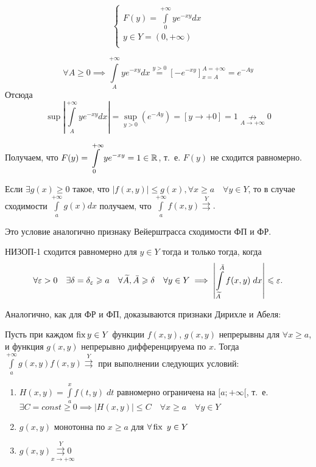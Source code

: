 \documentclass[../../main.tex]{subfiles}
\begin{document}
\begin{exmp}
\[ \left\{\begin{array}{l}
		F(y)=\int\limits_0^{+\infty}ye^{-xy}dx\\
		y \in Y = (0,+\infty)\\
		\end{array}
		\right. \]

\[\forall A \ge 0 \implies \int\limits_A^{+\infty}ye^{-xy}dx \overset{y > 0} = 
\left[-e^{-xy} \right]_{x = A}^{A = +\infty} = e^{-Ay}\]
Отсюда
\[\sup\left| \int\limits_A^{+\infty}ye^{-xy}dx \right|=\underset{y > 0}\sup  
\left( e^{-Ay}\right) = \left[y \to +0\right] = 1 \underset{A \to 
+\infty}\nrightarrow 0\]

Получаем, что $F(y) = \displaystyle\int\limits_0^{+\infty}ye^{-xy} = 1 \in 
\mathbb{R}$, т.~е. $F(y)$ не сходится 
равномерно.
\end{exmp}

\begin{thm}
Если $\exists g(x) \ge 0$ такое, что $\left| f(x,y) \right| \le g(x), \forall 
x \ge a\quad
\forall y \in Y $, то в случае сходимости $\int\limits_a^{+\infty}g(x)dx$ 
получаем, что 
$\int\limits_a^{+\infty}f(x,y) \overset{Y}\rightrightarrows.$ 
\end{thm}

Это условие аналогично признаку Вейерштрасса сходимости ФП и ФР.

\begin{crl*}
НИЗОП-1 сходится равномерно для $ y \in Y$ тогда и только тогда, 
когда\begin{equation}\label{lec10:11} \forall \varepsilon > 0\quad \exists \delta = 
\delta_\varepsilon \geqslant a\quad \forall \widetilde{A}, \bar{A} \geqslant \delta \quad \forall 
y 
\in Y \implies \left| \int\limits_{\widetilde{A}}^{\bar{A}}f(x,y)\;dx \right| 
\leqslant
\varepsilon. \end{equation}
\end{crl*}

Аналогично, как для ФР и ФП, доказываются признаки Дирихле и Абеля:

\begin{thm}

Пусть при каждом $\operatorname{fix} y \in Y$ функции $f(x,y)$, $g(x,y)$ непрерывны 
для $\forall x \ge a$, и функция $g(x, y)$ непрерывно дифференцируема по $x$.
Тогда $\int\limits_a^{+\infty} g(x,y)f(x,y) \overset{Y}{\rightrightarrows}$
при выполнении следующих условий:
\begin{enumerate}
	\item $H(x,y) = \int\limits_a^x f(t,y)\;dt$ равномерно ограничена на 
	$[a;+\infty[$, т.~е. $\exists C = const \ge 0 \implies 
	\left|H(x,y)\right| \le C \quad \forall x \ge a\quad \forall y \in Y$
	
	\item $g(x, y)$ монотонна по $x \ge a$ для $\forall \operatorname{fix} \ y \in Y$
	
	\item $g(x,y)\underset{x \to +\infty}{\overset{Y}{\rightrightarrows} 0}$
\end{enumerate}
\end{thm}
\end{document}
